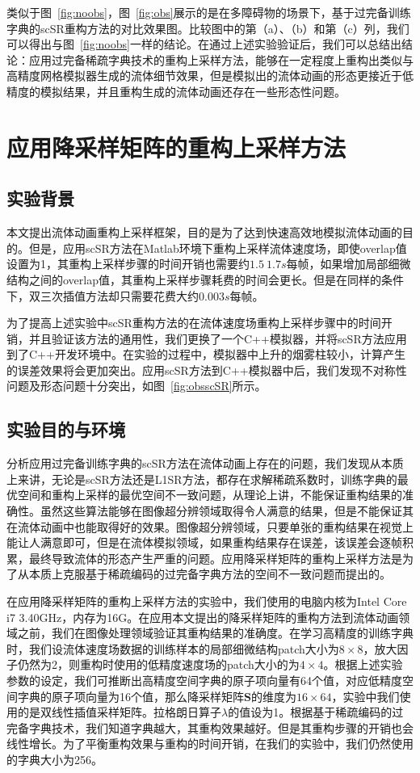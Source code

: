 类似于图~\ref{fig:noobs}，图~\ref{fig:obs}展示的是在多障碍物的场景下，基于过完备训练字典的scSR重构方法的对比效果图。比较图中的第（a）、（b）和第（c）列，我们可以得出与图~\ref{fig:noobs}一样的结论。在通过上述实验验证后，我们可以总结出结论：应用过完备稀疏字典技术的重构上采样方法，能够在一定程度上重构出类似与高精度网格模拟器生成的流体细节效果，但是模拟出的流体动画的形态更接近于低精度的模拟结果，并且重构生成的流体动画还存在一些形态性问题。

\section{应用降采样矩阵的重构上采样方法}

\subsection{实验背景}

本文提出流体动画重构上采样框架，目的是为了达到快速高效地模拟流体动画的目的。但是，应用scSR方法在Matlab环境下重构上采样流体速度场，即使overlap值设置为1，其重构上采样步骤的时间开销也需要约$1.5~1.7s$每帧，如果增加局部细微结构之间的overlap值，其重构上采样步骤耗费的时间会更长。但是在同样的条件下，双三次插值方法却只需要花费大约$0.003s$每帧。

为了提高上述实验中scSR重构方法的在流体速度场重构上采样步骤中的时间开销，并且验证该方法的通用性，我们更换了一个C++模拟器，并将scSR方法应用到了C++开发环境中。在实验的过程中，模拟器中上升的烟雾柱较小，计算产生的误差效果将会更加突出。应用scSR方法到C++模拟器中后，我们发现不对称性问题及形态问题十分突出，如图~\ref{fig:obsscSR}所示。

\subsection{实验目的与环境}

 分析应用过完备训练字典的scSR方法在流体动画上存在的问题，我们发现从本质上来讲，无论是scSR方法还是L1SR方法，都存在求解稀疏系数时，训练字典的最优空间和重构上采样的最优空间不一致问题，从理论上讲，不能保证重构结果的准确性。虽然这些算法能够在图像超分辨领域取得令人满意的结果，但是不能保证其在流体动画中也能取得好的效果。图像超分辨领域，只要单张的重构结果在视觉上能让人满意即可，但是在流体模拟领域，如果重构结果存在误差，该误差会逐帧积累，最终导致流体的形态产生严重的问题。应用降采样矩阵的重构上采样方法是为了从本质上克服基于稀疏编码的过完备字典方法的空间不一致问题而提出的。
 
 在应用降采样矩阵的重构上采样方法的实验中，我们使用的电脑内核为Intel Core i7 3.40GHz，内存为16G。在应用本文提出的降采样矩阵的重构方法到流体动画领域之前，我们在图像处理领域验证其重构结果的准确度。在学习高精度的训练字典时，我们设流体速度场数据的训练样本的局部细微结构patch大小为$8\times8$，放大因子仍然为2，则重构时使用的低精度速度场的patch大小的为$4\times4$。根据上述实验参数的设定，我们可推断出高精度空间字典的原子项向量有64个值，对应低精度空间字典的原子项向量为16个值，那么降采样矩阵$\boldsymbol S$的维度为$16 \times 64$，实验中我们使用的是双线性插值采样矩阵。拉格朗日算子$\lambda$的值设为1。根据基于稀疏编码的过完备字典技术，我们知道字典越大，其重构效果越好。但是其重构步骤的开销也会线性增长。为了平衡重构效果与重构的时间开销，在我们的实验中，我们仍然使用的字典大小为256。
 
